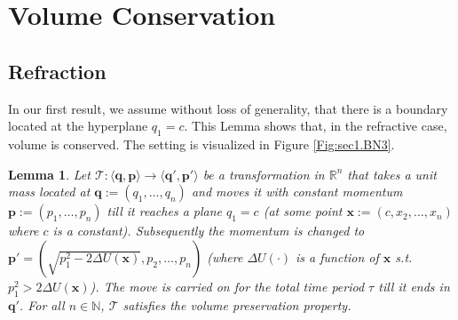 \documentclass{article} %
\newtheorem{lemma}{Lemma}
\newcommand{\tuple}[1] {\langle #1 \rangle}
\newcommand{\bvec}[1]{\textbf{#1}}
\begin{document}
\section{Volume Conservation}


\subsection{Refraction}

In our first result, we assume without loss of generality, that there is a boundary located at the hyperplane $q_1=c$.  This Lemma shows that, in the refractive case, volume is conserved. The setting is visualized in Figure \ref{Fig:sec1.BN3}.

\begin{lemma} 
\label{lemma1}
Let $\mathcal{T}: \tuple{\bvec{q}, \bvec{p}} \rightarrow \tuple{\bvec{q}', \bvec{p}'}$ be a transformation in $\mathbb{R}^n$
that takes a unit mass located at $\bvec{q} := (q_1, \ldots, q_n)$ and moves it with constant momentum $\bvec{p} := (p_1, \ldots, p_n)$ till it reaches a plane $q_1 = c$ (at some point $\bvec{x} := (c, x_2, \ldots, x_n)$ where 
$c$ is a constant).
Subsequently the momentum is changed to 
$
\bvec{p}' = \left(\sqrt{p_1^2 - 2 \Delta U(\bvec{x})}, p_2, \ldots, p_n \right)
$
(where $\Delta U(\cdot)$ is a function of $\bvec{x}$ s.t.\ $p_1^2 > 2 \Delta U(\bvec{x})$).
The move is carried on for the total time period $\tau$ till it ends in $\bvec{q}'$. 
For all $n \in \mathbb{N}$, $\mathcal{T}$ satisfies the volume preservation property.
\end{lemma}
\end{document}
